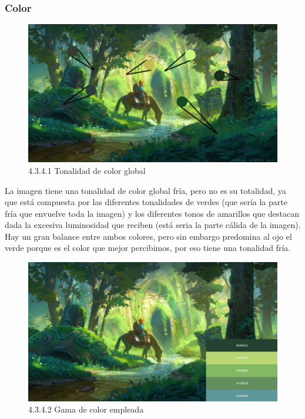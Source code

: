 \documentclass[12pt]{article}
\begin{document}
        \subsubsection{Color}


    \begin{figure}[H]
      \centering
      \includegraphics[width=\textwidth]{images/Saúl/Sección 3/EA_img3_4Color_1TonalidadGenral.png}
      \caption{\small 4.3.4.1 Tonalidad de color global}
    \end{figure}

La imagen tiene una tonalidad de color global fría, pero no es su totalidad, ya que está compuesta por las diferentes tonalidades de verdes (que sería la parte fría que envuelve toda la imagen) y los diferentes tonos de amarillos que destacan dada la excesiva luminosidad que reciben (está seria la parte cálida de la imagen). Hay un gran balance entre ambos colores, pero sin embargo predomina al ojo el verde porque es el color que mejor percibimos, por eso tiene una tonalidad fría.

    \begin{figure}[H]
      \centering
      \includegraphics[width=\textwidth]{images/Saúl/Sección 3/EA_img3_4Color_2GamaColores.png}
      \caption{\small 4.3.4.2 Gama de color empleada}
    \end{figure}
\end{document}

